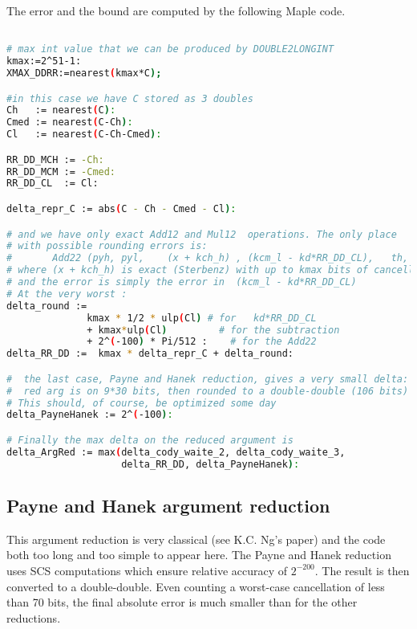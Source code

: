 The error and the bound are computed by the following Maple code.

\begin{lstlisting}[caption={Computing constants for Cody and Waite
    double-double}, firstnumber=1,
  language={sh}]% of course it's maple
%Skip a line here, I don't know why, otherwise latex eats the first line

# max int value that we can be produced by DOUBLE2LONGINT
kmax:=2^51-1:
XMAX_DDRR:=nearest(kmax*C);

#in this case we have C stored as 3 doubles
Ch   := nearest(C):
Cmed := nearest(C-Ch):
Cl   := nearest(C-Ch-Cmed):

RR_DD_MCH := -Ch:
RR_DD_MCM := -Cmed:
RR_DD_CL  := Cl:

delta_repr_C := abs(C - Ch - Cmed - Cl):

# and we have only exact Add12 and Mul12  operations. The only place
# with possible rounding errors is:
#       Add22 (pyh, pyl,    (x + kch_h) , (kcm_l - kd*RR_DD_CL),   th, tl) ;
# where (x + kch_h) is exact (Sterbenz) with up to kmax bits of cancellation
# and the error is simply the error in  (kcm_l - kd*RR_DD_CL)
# At the very worst :
delta_round :=
              kmax * 1/2 * ulp(Cl) # for   kd*RR_DD_CL
              + kmax*ulp(Cl)         # for the subtraction
              + 2^(-100) * Pi/512 :    # for the Add22
delta_RR_DD :=  kmax * delta_repr_C + delta_round:

#  the last case, Payne and Hanek reduction, gives a very small delta:
#  red arg is on 9*30 bits, then rounded to a double-double (106 bits)
# This should, of course, be optimized some day
delta_PayneHanek := 2^(-100):

# Finally the max delta on the reduced argument is
delta_ArgRed := max(delta_cody_waite_2, delta_cody_waite_3,
                    delta_RR_DD, delta_PayneHanek):
\end{lstlisting}


\subsection{Payne and Hanek argument reduction }

This argument reduction is very classical (see K.C. Ng's paper) and
the code both too long and too simple to appear here. The Payne and
Hanek reduction uses SCS computations which ensure relative accuracy
of $2^{-200}$. The result is then converted to a double-double.
Even counting a worst-case cancellation of less than 70 bits, the final
absolute error is much smaller than for the other reductions. 


